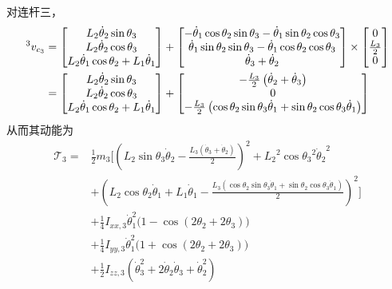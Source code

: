 \documentclass{ctexart}
\begin{document}
对连杆三，
\[
    \begin{aligned}
        \prescript{3}{}{v_{c_3}} & = \begin{bmatrix}
            {L_2} \dot\theta_2 \sin\theta_3\\
                {L_2} \dot\theta_2 \cos\theta_3\\
                {L_2} \dot\theta_1 \cos\theta_2 + L_1 \dot \theta_1
        \end{bmatrix} + \begin{bmatrix}
            -\dot\theta_1 \cos\theta_2 \sin\theta_3 -\dot\theta_1 \sin\theta_2 \cos\theta_3\\
            \dot\theta_1 \sin\theta_2 \sin\theta_3 - \dot\theta_1 \cos\theta_2 \cos\theta_3\\
            \dot\theta_3 + \dot\theta_2
        \end{bmatrix} \times \begin{bmatrix}
            0 \\ \frac{L_3}{2} \\ 0 \\
        \end{bmatrix} \\
        & = \begin{bmatrix}
            {L_2} \dot\theta_2 \sin\theta_3\\
                {L_2} \dot\theta_2 \cos\theta_3\\
                {L_2} \dot\theta_1 \cos\theta_2 + L_1 \dot \theta_1
        \end{bmatrix} + \begin{bmatrix}
            - \frac{L_3}{2} \left( \dot \theta_2 + \dot \theta_3\right) \\
            0 \\
            - \frac{{L_3}}{2}  \left( \cos\theta_2 \sin\theta_3 \dot\theta_1 + \sin\theta_2 \cos\theta_3 \dot\theta_1 \right) 
        \end{bmatrix}
    \end{aligned}
\]
从而其动能为
\[
    \begin{aligned}
        \mathcal T_3 = & \frac{1}{2} m_3 \Big[ {{\left( {L_2} \sin\theta_3 \dot\theta_2-\frac{{L_3} \left( \dot\theta_3+\dot\theta_2\right) }{2}\right) }^{2}}+{{{L_2}}^{2}} {{\cos\theta_3}^{2}} {{\dot\theta_2}^{2}} \\ 
        &+ {{\left( {L_2} \cos\theta_2 \dot\theta_1 + L_1 \dot \theta_1 -\frac{{L_3} \left( \cos\theta_2 \sin\theta_3 \dot\theta_1+\sin\theta_2 \cos\theta_3 \dot\theta_1\right) }{2}\right) }^{2}} \Big] \\
        &+ \frac{1}{4} I_{xx,3} \dot\theta_1^2 \big( 1 - \cos(2\theta_2 + 2\theta_3) \big) \\
        &+ \frac{1}{4} I_{yy,3} \dot\theta_1^2 \big( 1 + \cos(2\theta_2 + 2\theta_3) \big) \\
        &+ \frac{1}{2} I_{zz,3} (\dot\theta_3^2 + 2 \dot\theta_2 \dot\theta_3 + \dot\theta_2^2)
    \end{aligned}
\]
\end{document}
